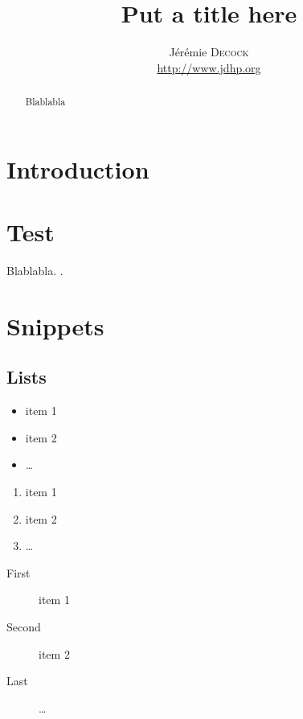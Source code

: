 \documentclass{article}
\title{Put a title here}
\author{J\'er\'emie \textsc{Decock} \\ \url{http://www.jdhp.org}}
\begin{document}
\maketitle

\begin{abstract}
  Blablabla
\end{abstract}

\tableofcontents


\section{Introduction}\label{sec:intro}


\section{Test}\label{sec:test}

Blablabla.
\cite{decock:hal-00755663}.


\section{Snippets}\label{sec:snippets}

\subsection{Lists}\label{subsec:lists}

\begin{itemize}
    \item item 1
    \item item 2
    \item \dots
\end{itemize}

\begin{enumerate}
    \item item 1
    \item item 2
    \item \dots
\end{enumerate}

\begin{description}
    \item[First] item 1
    \item[Second] item 2
    \item[Last] \dots
\end{description}
\end{document}
